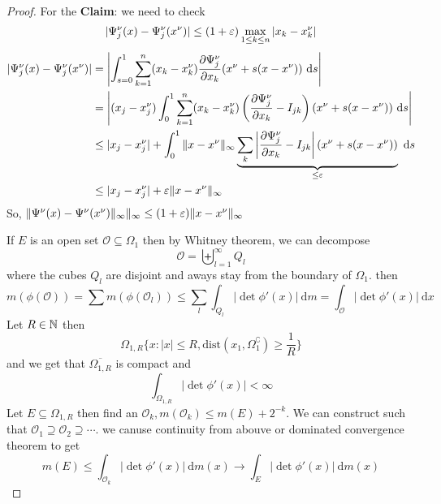 \begin{proof}
  For the \textbf{Claim}: we need to check
  \[|\Psi^\nu_j(x) - \Psi_j^\nu(x^\nu)| \le (1 + \varepsilon)\max_{1 \le k \le n} |x_k - x_k^\nu|\]
  \begin{align*}
    |\Psi^\nu_j(x) - \Psi_j^\nu(x^\nu)| &= \left|\int_{s=0}^1 \sum_{k=1}^n (x_k - x_k^\nu) \frac{\partial \Psi_j^\nu}{\partial x_k} (x^\nu + s(x - x^\nu)) \ \mathrm{d}s\right| \\
    &=\left|(x_j - x_j^\nu)\int_0^1\sum_{k=1}^n (x_k - x_k^\nu) \left(\frac{\partial\Psi_j^\nu}{\partial{x_k}} - I_{jk}\right)(x^\nu + s(x - x^\nu)) \ \mathrm{d}s\right| \\
    &\le |x_j - x_j^\nu| + \int_0^1 \|x - x^\nu\|_{\infty} \underbrace{\sum_{k} \left|\frac{\partial\Psi_j^\nu}{\partial{x_k}} - I_{jk}\right| (x^\nu + s(x - x^\nu))}_{\le \varepsilon}  \ \mathrm{d}s \\
    &\le |x_j - x_j^\nu| + \varepsilon \|x - x^\nu\|_\infty 
  \end{align*}
  So, $\|\Psi^\nu(x) - \Psi^\nu(x^\nu)\|_\infty\|_\infty \le (1 + \varepsilon)\|x - x^\nu\|_\infty$

  If $E$ is an open set $\mathcal O \subseteq \Omega_1$ then by Whitney theorem, we can decompose 
  \[\mathcal O = \biguplus_{l=1}^\infty Q_l\]
  where the cubes $Q_l$ are disjoint and aways stay from the boundary of $\Omega_1$.
  then
  \[m(\phi(\mathcal O)) = \sum m(\phi(\mathcal O_l)) \le \sum_l\int_{Q_l} |\det \phi'(x)| \ \mathrm{d}m = \int_{\mathcal O}|\det \phi'(x)| \ \mathrm{d}x\]
  Let $R \in \mathbb N$ then 
  \[\Omega_{1, R} \{x : |x| \le R, \mathrm{dist}(x_1, \Omega_1^\complement) \ge \frac1R\}\]
  and we get that $\overline{\Omega_{1, R}}$ is compact and
  \[\int_{\Omega_{1, R}} |\det \phi'(x)| < \infty\]
  Let $E \subseteq \Omega_{1, R}$ then find an $\mathcal{O}_k, m(\mathcal{O}_k) \le m(E) + 2^{-k}$.
  We can construct such that $\mathcal{O}_1 \supseteq \mathcal{O}_2 \supseteq \dotsm$.
  we canuse continuity from abouve or dominated convergence theorem to get
  \[m(E) \le \int_{\mathcal{O}_k} |\det \phi'(x)| \ \mathrm{d}m(x) \to \int_{E} |\det \phi'(x)| \ \mathrm{d}m(x)\]
\end{proof}
